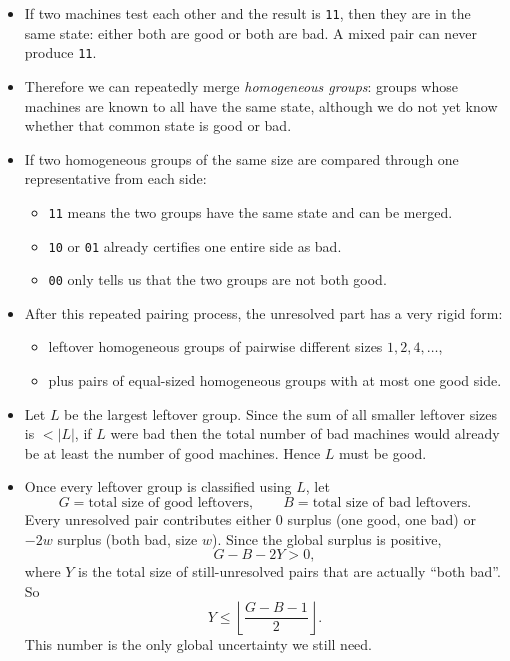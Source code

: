 \documentclass[11pt]{article}
\begin{document}
\begin{itemize}[leftmargin=*]
    \item If two machines test each other and the result is \texttt{11}, then they are in the same state: either both are good or both are bad. A mixed pair can never produce \texttt{11}.
    \item Therefore we can repeatedly merge \emph{homogeneous groups}: groups whose machines are known to all have the same state, although we do not yet know whether that common state is good or bad.
    \item If two homogeneous groups of the same size are compared through one representative from each side:
    \begin{itemize}[leftmargin=*]
        \item \texttt{11} means the two groups have the same state and can be merged.
        \item \texttt{10} or \texttt{01} already certifies one entire side as bad.
        \item \texttt{00} only tells us that the two groups are not both good.
    \end{itemize}
    \item After this repeated pairing process, the unresolved part has a very rigid form:
    \begin{itemize}[leftmargin=*]
        \item leftover homogeneous groups of pairwise different sizes $1,2,4,\dots$,
        \item plus pairs of equal-sized homogeneous groups with at most one good side.
    \end{itemize}
    \item Let $L$ be the largest leftover group. Since the sum of all smaller leftover sizes is $< |L|$, if $L$ were bad then the total number of bad machines would already be at least the number of good machines. Hence $L$ must be good.
    \item Once every leftover group is classified using $L$, let
    \[
        G = \text{total size of good leftovers}, \qquad
        B = \text{total size of bad leftovers}.
    \]
    Every unresolved pair contributes either $0$ surplus (one good, one bad) or $-2w$ surplus (both bad, size $w$). Since the global surplus is positive,
    \[
        G - B - 2Y > 0,
    \]
    where $Y$ is the total size of still-unresolved pairs that are actually ``both bad''. So
    \[
        Y \le \left\lfloor \frac{G-B-1}{2} \right\rfloor .
    \]
    This number is the only global uncertainty we still need.
\end{itemize}
\end{document}
